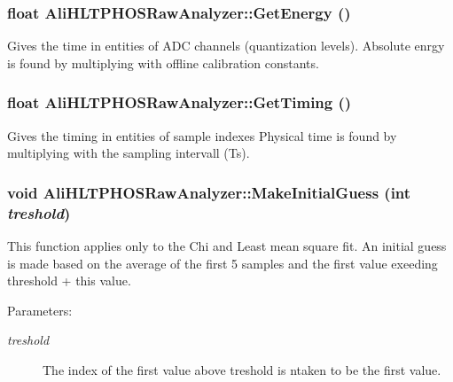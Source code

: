 \subsubsection{\setlength{\rightskip}{0pt plus 5cm}float Ali\-HLTPHOSRaw\-Analyzer::Get\-Energy ()}\label{classAliHLTPHOSRawAnalyzer_a9}


Gives the time in entities of ADC channels (quantization levels). Absolute enrgy is found by multiplying with offline calibration constants. 
\subsubsection{\setlength{\rightskip}{0pt plus 5cm}float Ali\-HLTPHOSRaw\-Analyzer::Get\-Timing ()}\label{classAliHLTPHOSRawAnalyzer_a8}


Gives the timing in entities of sample indexes Physical time is found by multiplying with the sampling intervall (Ts). 
\subsubsection{\setlength{\rightskip}{0pt plus 5cm}void Ali\-HLTPHOSRaw\-Analyzer::Make\-Initial\-Guess (int {\em treshold})}\label{classAliHLTPHOSRawAnalyzer_a13}


This function applies only to the Chi and Least mean square fit. An initial guess is made based on the average of the first 5 samples and the first value exeeding threshold + this value. \begin{Desc}
\item[Parameters:]
\begin{description}
\item[{\em treshold}]The index of the first value above treshold is ntaken to be the first value. \end{description}
\end{Desc}
